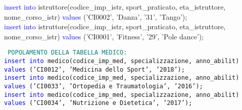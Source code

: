 \documentclass{article}
\begin{document}
\begin{flushleft}
{        \vspace{2mm}
        \hspace*{0.5em}\textcolor{blue}{insert into} istruttore(codice\_imp\_istr, sport\_praticato, eta\_istruttore, \hspace*{0.5em}nome\_corso\_istr) \textcolor{blue}{values} ('CI0002', 'Danza', '31', 'Tango'); \\
        \vspace{2mm}
        \hspace*{0.5em}\textcolor{blue}{insert into} istruttore(codice\_imp\_istr, sport\_praticato, eta\_istruttore, \hspace*{0.5em}nome\_corso\_istr) \textcolor{blue}{values} ('CI0001', 'Fitness', '29', 'Pole dance'); \\ }
    \end{flushleft}

    \begin{flushleft}
        \texttt{
        \textcolor{teal}{POPOLAMENTO DELLA TABELLA MEDICO:} \\
        \hspace*{0.5em}\textcolor{blue}{insert into} medico(codice\_imp\_med, specializzazione, anno\_abilit) \textcolor{blue}{values} \hspace*{0.5em}('CI0012', 'Medicina dello Sport', '2018'); \\
        \hspace*{0.5em}\textcolor{blue}{insert into} medico(codice\_imp\_med, specializzazione, anno\_abilit) \textcolor{blue}{values} \hspace*{0.5em}('CI0033', 'Ortopedia e Traumatologia', '2016'); \\
        \hspace*{0.5em}\textcolor{blue}{insert into} medico(codice\_imp\_med, specializzazione, anno\_abilit) \textcolor{blue}{values} \hspace*{0.5em}('CI0034', 'Nutrizione e Dietetica', '2017'); \\}
    \end{flushleft}
\end{document}
